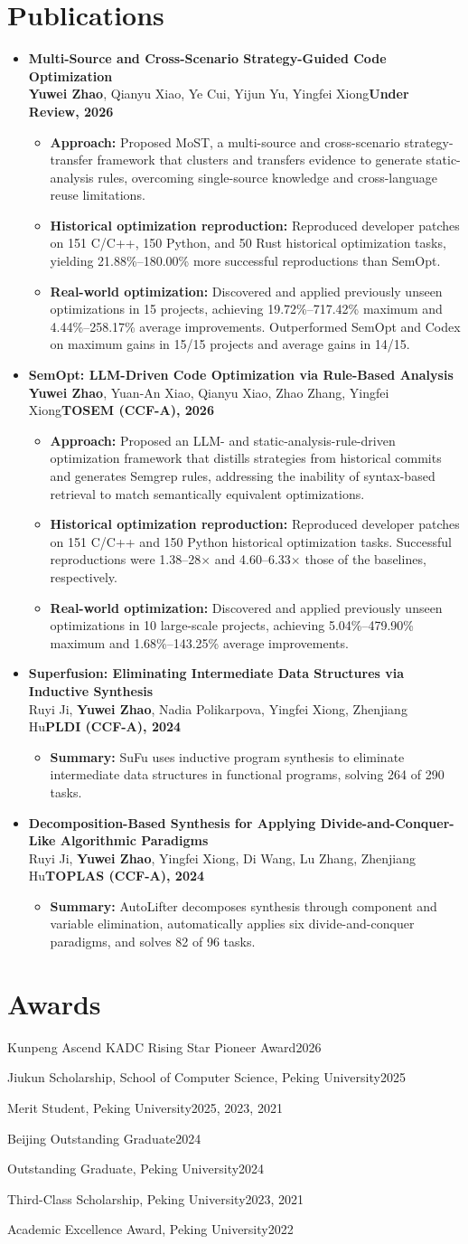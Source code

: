 \documentclass[10pt,a4paper]{article}
\newcommand{\researchpaperentry}[6]{%
  \item \textbf{#1}\\[-1pt]
  {\small #2\hfill\textbf{\textcolor{msblue}{#3}}}
  \begin{itemize}[leftmargin=1.3em,label={\textcolor{msblue}{\scriptsize\textbullet}},itemsep=1pt,topsep=2pt,parsep=0pt,partopsep=0pt]
    \small
    \item \textbf{Approach:} #4
    \item \textbf{Historical optimization reproduction:} #5
    \item \textbf{Real-world optimization:} #6
  \end{itemize}
}
\newcommand{\paperentrywithsummary}[4]{%
  \item \textbf{#1}\\[-1pt]
  {\small #2\hfill\textbf{\textcolor{msblue}{#3}}}
  \begin{itemize}[leftmargin=1.3em,label={\textcolor{msblue}{\scriptsize\textbullet}},itemsep=1pt,topsep=2pt,parsep=0pt,partopsep=0pt]
    \small
    \item \textbf{Summary:} #4
  \end{itemize}
}
\newcommand{\awardentry}[2]{%
  \noindent #1\hfill\textcolor{muted}{#2}\par\vspace{3.5pt}
}
\begin{document}
\section{Publications}
\begin{itemize}
  \researchpaperentry
    {Multi-Source and Cross-Scenario Strategy-Guided Code Optimization}
    {\textbf{Yuwei Zhao}, Qianyu Xiao, Ye Cui, Yijun Yu, Yingfei Xiong}
    {Under Review, 2026}
    {Proposed MoST, a multi-source and cross-scenario strategy-transfer framework that clusters and transfers evidence to generate static-analysis rules, overcoming single-source knowledge and cross-language reuse limitations.}
    {Reproduced developer patches on 151 C/C++, 150 Python, and 50 Rust historical optimization tasks, yielding 21.88\%--180.00\% more successful reproductions than SemOpt.}
    {Discovered and applied previously unseen optimizations in 15 projects, achieving 19.72\%--717.42\% maximum and 4.44\%--258.17\% average improvements. Outperformed SemOpt and Codex on maximum gains in 15/15 projects and average gains in 14/15.}
  \researchpaperentry
    {SemOpt: LLM-Driven Code Optimization via Rule-Based Analysis}
    {\textbf{Yuwei Zhao}, Yuan-An Xiao, Qianyu Xiao, Zhao Zhang, Yingfei Xiong}
    {TOSEM (CCF-A), 2026}
    {Proposed an LLM- and static-analysis-rule-driven optimization framework that distills strategies from historical commits and generates Semgrep rules, addressing the inability of syntax-based retrieval to match semantically equivalent optimizations.}
    {Reproduced developer patches on 151 C/C++ and 150 Python historical optimization tasks. Successful reproductions were 1.38--28$\times$ and 4.60--6.33$\times$ those of the baselines, respectively.}
    {Discovered and applied previously unseen optimizations in 10 large-scale projects, achieving 5.04\%--479.90\% maximum and 1.68\%--143.25\% average improvements.}
  \paperentrywithsummary
    {Superfusion: Eliminating Intermediate Data Structures via Inductive Synthesis}
    {Ruyi Ji, \textbf{Yuwei Zhao}, Nadia Polikarpova, Yingfei Xiong, Zhenjiang Hu}
    {PLDI (CCF-A), 2024}
    {SuFu uses inductive program synthesis to eliminate intermediate data structures in functional programs, solving 264 of 290 tasks.}
  \paperentrywithsummary
    {Decomposition-Based Synthesis for Applying Divide-and-Conquer-Like Algorithmic Paradigms}
    {Ruyi Ji, \textbf{Yuwei Zhao}, Yingfei Xiong, Di Wang, Lu Zhang, Zhenjiang Hu}
    {TOPLAS (CCF-A), 2024}
    {AutoLifter decomposes synthesis through component and variable elimination, automatically applies six divide-and-conquer paradigms, and solves 82 of 96 tasks.}
\end{itemize}

\section{Awards}
\awardentry{Kunpeng Ascend KADC Rising Star Pioneer Award}{2026}
\awardentry{Jiukun Scholarship, School of Computer Science, Peking University}{2025}
\awardentry{Merit Student, Peking University}{2025, 2023, 2021}
\awardentry{Beijing Outstanding Graduate}{2024}
\awardentry{Outstanding Graduate, Peking University}{2024}
\awardentry{Third-Class Scholarship, Peking University}{2023, 2021}
\awardentry{Academic Excellence Award, Peking University}{2022}
\end{document}

